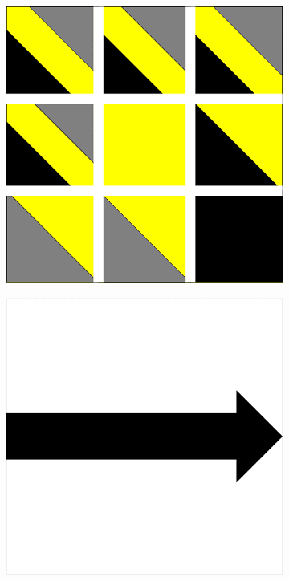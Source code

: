 \documentclass[a4paper]{article}
\begin{document}
\begin{figure}[!h]
    \centering
    \begin{subfigure}[t]{0.17\textwidth}
        \includegraphics[width=\textwidth]{img/rule30.png}
    \end{subfigure}
    \hfill
      \begin{subfigure}[t]{0.17\textwidth} 
        \includegraphics[width=\textwidth]{img/fleche3.png} 

\end{subfigure}
\end{figure}
\end{document}

